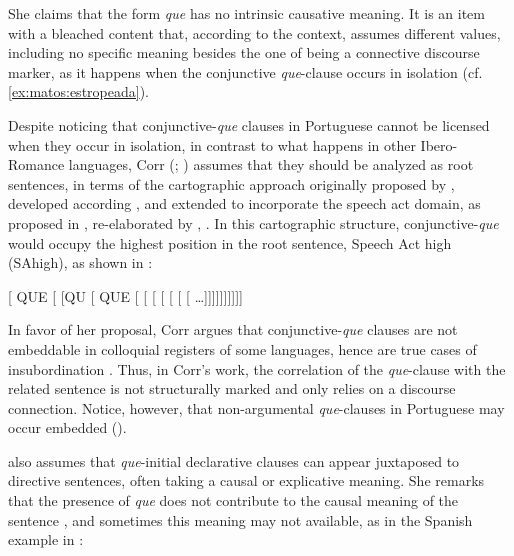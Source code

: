 \documentclass[output=paper,colorlinks,citecolor=brown,
]{langscibook}
\begin{document}
She claims that the form \textit{que} has no intrinsic causative meaning. It is an item with a bleached content that, according to the context, assumes different values, including no specific meaning besides the one of being a connective discourse marker, as it happens when the conjunctive \textit{que}-clause occurs in isolation (cf. \ref{ex:matos:estropeada}).

Despite noticing that conjunctive-\textit{que} clauses in Portuguese cannot be licensed when they occur in isolation, in contrast to what happens in other Ibero-Romance languages, Corr (\citeyear{corr_ibero-romance_2016}; \citeyear{corr_matrix_2018}) assumes that they should be analyzed as root sentences, in terms of the cartographic approach originally proposed by \citet{rizzi_fine_1997}, developed according \citet{ledgeway_latin_2012}, and extended to incorporate the speech act domain, as proposed in \citet{speas_configurational_2003}, re-elaborated by \citet{haegeman_west_2014}, \citet{haegeman_syntacticization_2013}. In this cartographic structure, conjunctive-\textit{que} would occupy the highest position in the root sentence, Speech Act high (SAhigh), as shown in :

\ea \label{ex:matos:saphigh}
[ QUE [ [QU [ QUE [ [ [ [ [ [ [ \ldots ]]]]]]]]]]\\
\citep[90]{corr_matrix_2018}
\z 

In favor of her proposal, Corr argues that conjunctive-\textit{que} clauses are not embeddable in colloquial registers of some languages, hence are true cases of insubordination \citep[91]{corr_matrix_2018}. Thus, in Corr’s work, the correlation of the \textit{que}-clause with the related sentence is not structurally marked and only relies on a discourse connection. Notice, however, that non-argumental \textit{que}-clauses in Portuguese may occur embedded ().

\citet[148]{kocher_unselected_2019} also assumes that \textit{que}-initial declarative clauses can appear juxtaposed to directive sentences, often taking a causal or explicative meaning. She remarks that the presence of \textit{que} does not contribute to the causal meaning of the sentence , and sometimes this meaning may not available, as in the Spanish example in :
\end{document}
